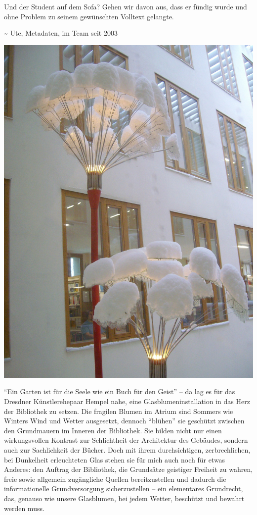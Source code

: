 Und der Student auf dem Sofa? Gehen wir davon aus, dass er fündig wurde
und ohne Problem zu seinem gewünschten Volltext gelangte.

\textasciitilde{} Ute, Metadaten, im Team seit 2003

\begin{center}
\includegraphics{htw-dresden/img/Glasblumen.jpg}
\end{center}

\enquote{Ein Garten ist für die Seele wie ein Buch für den Geist} -- da
lag es für das Dresdner Künstlerehepaar Hempel nahe, eine
Glasblumeninstallation in das Herz der Bibliothek zu setzen. Die
fragilen Blumen im Atrium sind Sommers wie Winters Wind und Wetter
ausgesetzt, dennoch \enquote{blühen} sie geschützt zwischen den
Grundmauern im Inneren der Bibliothek. Sie bilden nicht nur einen
wirkungsvollen Kontrast zur Schlichtheit der Architektur des Gebäudes,
sondern auch zur Sachlichkeit der Bücher. Doch mit ihrem durchsichtigen,
zerbrechlichen, bei Dunkelheit erleuchteten Glas stehen sie für mich
auch noch für etwas Anderes: den Auftrag der Bibliothek, die Grundsätze
geistiger Freiheit zu wahren, freie sowie allgemein zugängliche Quellen
bereitzustellen und dadurch die informationelle Grundversorgung
sicherzustellen -- ein elementares Grundrecht, das, genauso wie unsere
Glasblumen, bei jedem Wetter, beschützt und bewahrt werden muss.

